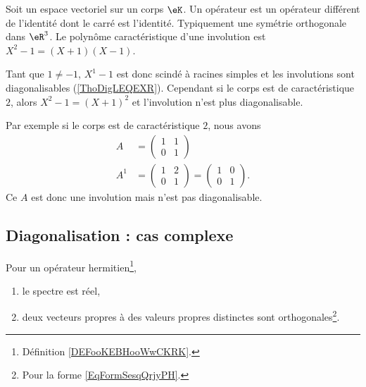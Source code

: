 \begin{example}     \label{ExewINgYo}
    Soit un espace vectoriel sur un corps \( \eK\). Un opérateur  est un opérateur différent de l'identité dont le carré est l'identité. Typiquement une symétrie orthogonale dans \( \eR^3\). Le polynôme caractéristique d'une involution est \( X^2-1=(X+1)(X-1)\).
    
    Tant que \( 1\neq -1\), \( X^1-1\) est donc scindé à racines simples et les involutions sont diagonalisables (\ref{ThoDigLEQEXR}). Cependant si le corps est de caractéristique \( 2\), alors \( X^2-1=(X+1)^2\) et l'involution n'est plus diagonalisable.

    Par exemple si le corps est de caractéristique \( 2\), nous avons
    \begin{subequations}
        \begin{align}
            A&=\begin{pmatrix}
                1    &   1    \\ 
                0    &   1    
            \end{pmatrix}\\
            A^1&=\begin{pmatrix}
                1    &   2    \\ 
                0    &   1    
            \end{pmatrix}=\begin{pmatrix}
                1    &   0    \\ 
                0    &   1    
            \end{pmatrix}.
        \end{align}
    \end{subequations}
    Ce \( A\) est donc une involution mais n'est pas diagonalisable.
\end{example}

\subsection{Diagonalisation : cas complexe}

\begin{lemma}      \label{LEMooVCEOooIXnTpp}
    Pour un opérateur hermitien\footnote{Définition \ref{DEFooKEBHooWwCKRK}.},
    \begin{enumerate}
        \item
            le spectre est réel,
        \item
            deux vecteurs propres à des valeurs propres distinctes sont orthogonales\footnote{Pour la forme \eqref{EqFormSesqQrjyPH}.}.
    \end{enumerate}
\end{lemma}

